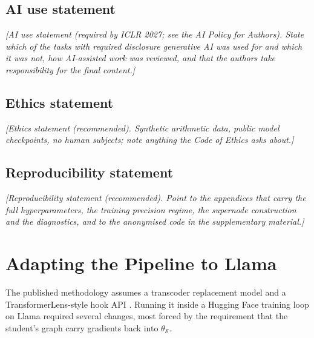 \documentclass{article}
\newcommand{\todosec}[1]{{\color{Gray}\emph{[#1]}}}
\newcommand{\pending}[1]{{\color{BurntOrange}\emph{[pending#1]}}}
\newcommand{\Stud}{\mathcal{S}}
\begin{document}
\subsection*{AI use statement}

\todosec{AI use statement (required by ICLR 2027; see the AI Policy for Authors).
State which of the tasks with required disclosure generative AI was used for and
which it was not, how AI-assisted work was reviewed, and that the authors take
responsibility for the final content.}

\subsection*{Ethics statement}

\todosec{Ethics statement (recommended). Synthetic arithmetic data, public model
checkpoints, no human subjects; note anything the Code of Ethics asks about.}

\subsection*{Reproducibility statement}

\todosec{Reproducibility statement (recommended). Point to the appendices that
carry the full hyperparameters, the training precision regime, the supernode
construction and the diagnostics, and to the anonymised code in the supplementary
material.}




\appendix


\section{Adapting the Pipeline to Llama}
\label{app:llama}

The published methodology assumes a transcoder replacement model and a TransformerLens-style hook
API \citep{ameisen2025circuit}. Running it inside a Hugging Face training loop on Llama required
several changes, most forced by the requirement that the student's graph carry gradients back into
$\theta_\Stud$.
\end{document}
